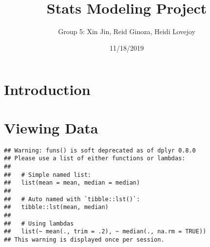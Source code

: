 \documentclass[]{article}
\title{Stats Modeling Project}
\author{Group 5: Xin Jin, Reid Ginoza, Heidi Lovejoy}
\date{11/18/2019}
\newenvironment{Shaded}{\begin{snugshade}}{\end{snugshade}}
\newcommand{\DataTypeTok}[1]{\textcolor[rgb]{0.13,0.29,0.53}{#1}}
\newcommand{\KeywordTok}[1]{\textcolor[rgb]{0.13,0.29,0.53}{\textbf{#1}}}
\newcommand{\NormalTok}[1]{#1}
\newcommand{\OperatorTok}[1]{\textcolor[rgb]{0.81,0.36,0.00}{\textbf{#1}}}
\newcommand{\StringTok}[1]{\textcolor[rgb]{0.31,0.60,0.02}{#1}}
\begin{document}
\maketitle

\begin{Shaded}
\end{Shaded}

\hypertarget{introduction}{%
\section{Introduction}\label{introduction}}

\hypertarget{viewing-data}{%
\section{Viewing Data}\label{viewing-data}}

\begin{Shaded}
\end{Shaded}

\begin{verbatim}
## Warning: funs() is soft deprecated as of dplyr 0.8.0
## Please use a list of either functions or lambdas: 
## 
##   # Simple named list: 
##   list(mean = mean, median = median)
## 
##   # Auto named with `tibble::lst()`: 
##   tibble::lst(mean, median)
## 
##   # Using lambdas
##   list(~ mean(., trim = .2), ~ median(., na.rm = TRUE))
## This warning is displayed once per session.
\end{verbatim}
\end{document}
